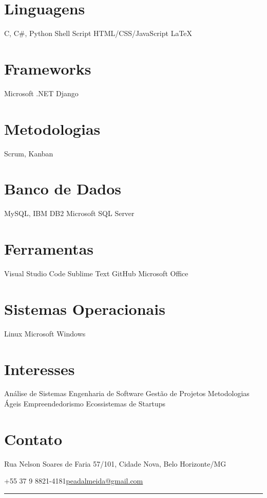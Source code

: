 \documentclass[a4paper]{cv-style}
\begin{document}
\begin{aside}
\section{Linguagens}
  C, C\#, Python
  Shell Script
  HTML/CSS/JavaScript
  \LaTeX
~
\section{Frameworks}
  Microsoft .NET
  Django
~
\section{Metodologias}
  Scrum, Kanban
~
\section{Banco de Dados}
  MySQL, IBM DB2
  Microsoft SQL Server
~
\section{Ferramentas}
Visual Studio Code
Sublime Text
GitHub
Microsoft Office
~
\section{Sistemas Operacionais}
  Linux
  Microsoft Windows
~
\section{Interesses}
Análise de Sistemas
Engenharia de Software
Gestão de Projetos
Metodologias Ágeis
Empreendedorismo
Ecossistemas de Startups
~
\end{aside}
\section{Contato}
  \centerline{{\Large\WritingHand\space}{Rua Nelson Soares de Faria 57/101, Cidade Nova, Belo Horizonte/MG}}
  {\vspace{2.9pt}} 
  \centerline{{\large\faPhone\space}{+55 37 9 8821-4181}\space\faEnvelopeO\space\underline{peadalmeida@gmail.com}}
  {\vspace{2.9pt}}
 
  \begin{center}
    \noindent\rule{13cm}{3.0pt}
  \end{center}
\end{document}
